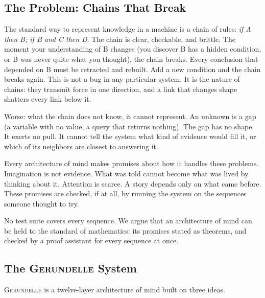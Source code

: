 \documentclass[11pt]{article}
\newcommand{\gerundelle}{\textsc{Gerundelle}}
\theoremstyle{remark}
\begin{document}
\subsection{The Problem: Chains That Break}

The standard way to represent knowledge in a machine is a chain of rules: \emph{if A then
B; if B and C then D}. The chain is clear, checkable, and brittle. The moment your
understanding of B changes (you discover B has a hidden condition, or B was never quite
what you thought), the chain breaks. Every conclusion that depended on B must be retracted
and rebuilt. Add a new condition and the chain breaks again. This is not a bug in any
particular system. It is the nature of chains: they transmit force in one direction, and a
link that changes shape shatters every link below it.

Worse: what the chain does not know, it cannot represent. An unknown is a gap (a variable
with no value, a query that returns nothing). The gap has no shape. It exerts no pull. It
cannot tell the system what kind of evidence would fill it, or which of its neighbors are
closest to answering it.

Every architecture of mind makes promises about how it handles these problems. Imagination
is not evidence. What was told cannot become what was lived by thinking about it. Attention
is scarce. A story depends only on what came before. These promises are checked, if at all,
by running the system on the sequences someone thought to try.

No test suite covers every sequence. We argue that an architecture of mind can be held to
the standard of mathematics: its promises stated as theorems, and checked by a proof
assistant for every sequence at once.

\subsection{The \gerundelle{} System}

\gerundelle{} is a twelve-layer architecture of mind built on three ideas.
\end{document}
